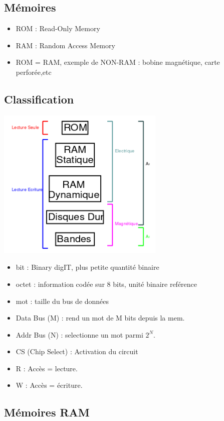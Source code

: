 \documentclass[10pt]{article}
\begin{document}
\begin{multicols}{2}
  \section{Mémoires}
  \begin{itemize}
    \itemsep0em
    \item ROM : Read-Only Memory
    \item RAM : Random Access Memory
    \item ROM = RAM, exemple de NON-RAM : bobine magnétique, carte perforée,etc
  \end{itemize}
  \subsection{Classification}
  \includegraphics[width=8cm]{./mem_chart1.png}

  \newpage
  \begin{itemize}
    \itemsep0em
    \item bit : Binary digIT, plus petite quantité binaire
    \item octet : information codée sur 8 bits, unité binaire reférence
    \item mot : taille du bus de données
  \end{itemize}
  \begin{itemize}
    \itemsep0em
    \item Data Bus (M) : rend un mot de M bits depuis la mem.
    \item Addr Bus (N) : selectionne un mot parmi $2^N$.
    \item CS (Chip Select) : Activation du circuit
    \item R : Accès = lecture.
    \item W : Accès = écriture.
  \end{itemize}
  \subsection{Mémoires RAM}

\end{multicols}
\end{document}
